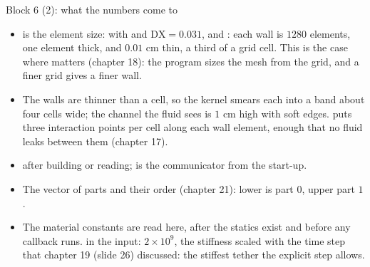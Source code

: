 \documentclass[aspectratio=169,11pt]{beamer}
\begin{document}
\begin{frame}{Block 6 (2): what the numbers come to}
\label{fr:meshes2}
\footnotesize
\begin{itemize}
  \item {} is the element size: with  and $\mathrm{DX} = 0.031$,  and : each wall is $1280$  elements, one element thick, and $0.01$ cm thin, a third of a grid cell. This is the case where  matters (chapter 18): the program sizes the mesh from the grid, and a finer grid gives a finer wall.
  \item The walls are thinner than a cell, so the kernel smears each into a band about four cells wide; the channel the fluid sees is $1$ cm high with soft edges.  puts three interaction points per cell along each wall element, enough that no fluid leaks between them (chapter 17).
  \item {} after building or reading;  is the communicator from the start-up.
  \item The vector of parts and their order (chapter 21): lower is part $0$, upper part $1$.
  \item The material constants are read here, after the  statics exist and before any callback runs.  in the input: $2\times10^9$, the stiffness scaled with the time step that chapter 19 (slide 26) discussed: the stiffest tether the explicit step allows.
\end{itemize}
\end{frame}
\end{document}
